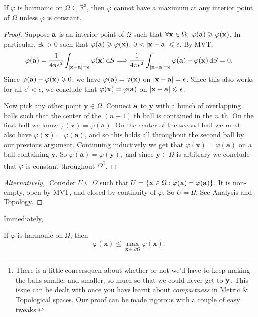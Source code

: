 \begin{proposition}
    If $ \varphi $ is harmonic on $ \Omega \subseteq \mathbb{R}^{3} $, then $ \varphi $ cannot have a maximum at any interior point of $ \Omega $ unless $ \varphi $ is constant.
\end{proposition}
\begin{proof}
    Suppose $ {\bf a} $ is an interior point of $ \Omega $ such that $ \forall \bfx\in \Omega,\ \varphi(\bfa)\ge \varphi(\bfx) $. In particular, $ \exists \epsilon>0 $ such that $ \varphi(\bfa)\ge \varphi(\bfx),\ 0<|\bfx-\bfa|\le\epsilon $. By MVT, 
    \[
        \varphi({\bf a}) = \frac{1}{4\pi \epsilon^2}\int_{|{\bf x}-{\bf a}|=\epsilon} \varphi({\bf x}) \,\mathrm{d}S \Longrightarrow \frac{1}{4\pi \epsilon^2}\int_{|{\bf x}-{\bf a}|=\epsilon} \varphi({\bf a})-\varphi({\bf x}) \,\mathrm{d}S=0.
    \]
    Since $ \varphi({\bf a})-\varphi({\bf x})\geqslant 0 $, we have $ \varphi({\bf a})=\varphi({\bf x}) $ on $ |{\bf x}-{\bf a}|=\epsilon $. Since this also works for all $ \epsilon'<\epsilon $, we conclude that $ \varphi({\bf x})=\varphi({\bf a}) $ on $ |{\bf x}-{\bf a}|\leqslant \epsilon $.

    Now pick any other point $\mathbf{y} \in \Omega$. Connect ${\bf a}$ to $\mathbf{y}$ with a bunch of overlapping balls such that the center of the $(n+1)$ th ball is contained in the $n$ th. On the first ball we know $\varphi(\mathbf{x})=\varphi(\mathbf{a})$. On the center of the second ball we must also have $\varphi(\mathbf{x})=\varphi(\mathbf{a})$, and so this holds all throughout the second ball by our previous argument. Continuing inductively we get that $\varphi(\mathbf{x})=\varphi(\mathbf{a})$ on a ball containing $\mathbf{y}$. So $\varphi(\mathbf{a})=\varphi(\mathbf{y}),$ and since $\mathbf{y} \in \Omega$ is arbitrary we conclude that $\varphi$ is constant throughout $\Omega$\footnote{There is a little concersquen about whether or not we’d have to keep making the balls smaller and smaller, so much so that we could never get to ${\bf y}$. This issue can be dealt with once you have learnt about \textit{compactness} in Metric \& Topological spaces. Our proof can be made rigorous with a couple of easy tweaks.}.
\end{proof}
\begin{proof}[Alternatively,]
    Consider $ U \subseteq \Omega $ such that $ U=\{{\bf x}\in \Omega: \varphi({\bf x})=\varphi({\bf a})\} $. It is non-empty, open by MVT, and closed by continuity of $ \varphi $. So $ U=\Omega $. See Analysis and Topology.
\end{proof}
Immediately,
\begin{corollary}
    If $ \varphi $ is harmonic on $ \Omega $, then 
    \[
        \varphi(\mathbf{x}) \le \max _{\mathbf{x} \in \partial \Omega} \varphi(\mathbf{x}).
    \]
\end{corollary}

